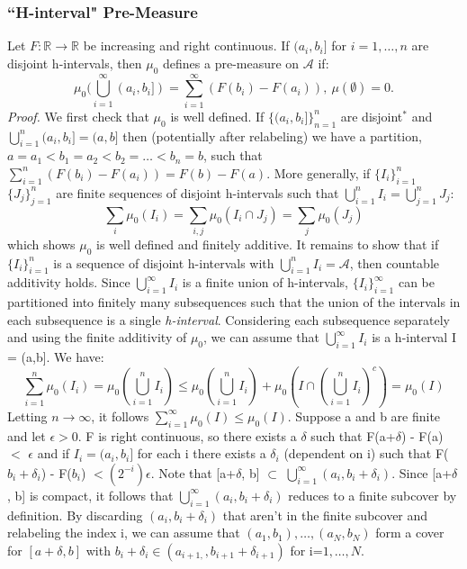 \documentclass{article}
\begin{document}
\subsubsection{``H-interval" Pre-Measure}
Let $F: \mathbb{R}\to \mathbb{R}$ be increasing and right continuous. If $(a_i,b_i]$ for $i=1,\ldots,n$ are disjoint h-intervals, then $\mu_0$ defines a pre-measure on $\mathcal{A}$ if: 
\[
\mu_0(\bigcup_{i=1}^{\infty}(a_i,b_i])= \sum_{i=1}^{\infty}(F(b_i)-F(a_i)), \ \mu(\emptyset) = 0.
\]
\textit{Proof.} \newline \newline
We first check that $\mu_0$ is well defined. If $\{(a_i,b_i]\}_{n=1}^{n}$ are disjoint$^*$ and $\bigcup_{i=1}^n(a_i,b_i]=(a,b]$ then (potentially after relabeling) we have a partition, $a=a_1<b_1 = a_2<b_2=\ldots<b_n=b$, such that $\sum_{i=1}^n(F(b_i)-F(a_i))= F(b) - F(a)$. More generally, if $\{I_i\}_{i=1}^{n}$ $\{J_j\}_{j=1}^{n}$ are finite sequences of disjoint h-intervals such that $\bigcup_{i=1}^nI_i = \bigcup_{j=1}^nJ_j$:
\[
\sum_{i}\mu_0(I_i) =\sum_{i,j}\mu_0(I_i \cap J_j)= \sum_{j}\mu_0(J_j)
\]
which shows $\mu_0$ is well defined and finitely additive. \newline \newline
It remains to show that if $\{I_i\}_{i=1}^{n}$ is a sequence of disjoint h-intervals with $\bigcup_{i=1}^nI_i = \mathcal{A}$, then countable additivity holds. Since $\bigcup_{i=1}^{\infty}I_i$ is a finite union of h-intervals, $\{I_i\}_{i=1}^{\infty}$ can be partitioned into finitely many subsequences such that the union of the intervals in each subsequence is a single \emph{h-interval}. Considering each subsequence separately and using the finite additivity of $\mu_0$, we can assume that $\bigcup_{i=1}^{\infty}I_i$ is a h-interval I = (a,b]. We have:
\[
\sum_{i=1}^n\mu_0(I_i)=\mu_0(\bigcup_{i=1}^{n}I_i) \leq \mu_0(\bigcup_{i=1}^{n}I_i) + \mu_0( I \cap (\bigcup_{i=1}^{n}I_i)^c)=\mu_0(I)
\]
Letting $n \to \infty$, it follows $\sum_{i=1}^{\infty}\mu_0(I)\leq\mu_0(I)$. \newline \newline
Suppose a and b are finite and let $\epsilon>0$. F is right continuous, so there exists a $\delta$ such that F(a+$\delta$) - F(a) $<$ $\epsilon$ and if $I_i=(a_i,b_i]$ for each i there exists a $\delta_i$ (dependent on i) such that F($b_i+\delta_i$) - F($b_i$) $< (2^{-i})\epsilon$. Note that [a+$\delta$, b] $\subset$ $\bigcup_{i=1}^{\infty}(a_i,b_i+\delta_i)$. Since [a+$\delta$, b] is compact, it follows that $\bigcup_{i=1}^{\infty}(a_i,b_i+\delta_i)$ reduces to a finite subcover by definition. By discarding $(a_i,b_i+\delta_i)$ that aren't in the finite subcover and relabeling the index i, we can assume that $(a_1,b_1),\ldots,(a_N,b_N)$ form a cover for $[a+\delta,b]$ with $b_i+\delta_i\in(a_{i+1,},b_{i+1}+\delta_{i+1})$ for i=$1,\ldots,N$.\newline \newline
\end{document}

